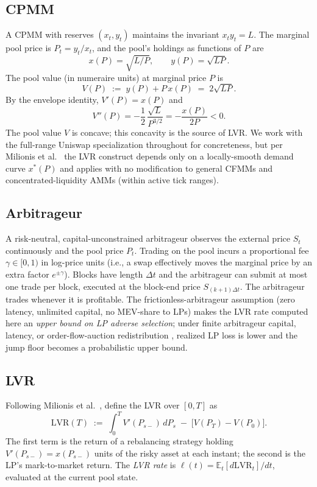 \documentclass[runningheads]{llncs}
\newcommand{\E}{\mathbb{E}}
\newcommand{\dt}{\Delta t}
\newcommand{\1}{\mathbf{1}}
\begin{document}
\subsection{CPMM}
A CPMM with reserves $(x_t, y_t)$ maintains the invariant $x_t y_t = L$. The marginal pool price is $P_t = y_t / x_t$, and the pool's holdings as functions of $P$ are
\[
x(P) = \sqrt{L/P}, \qquad y(P) = \sqrt{L P}.
\]
The pool value (in numeraire units) at marginal price $P$ is
\[
V(P) \;:=\; y(P) + P\,x(P) \;=\; 2\sqrt{LP}.
\]
By the envelope identity, $V'(P) = x(P)$ and
\[
V''(P) = -\frac{1}{2} \, \frac{\sqrt{L}}{P^{3/2}} = -\frac{x(P)}{2P} < 0.
\]
The pool value $V$ is concave; this concavity is the source of LVR. We work with the full-range Uniswap specialization throughout for concreteness, but per Milionis et al.~\cite[Remark~1]{milionis2022automated} the LVR construct depends only on a locally-smooth demand curve $x^*(P)$ and applies with no modification to general CFMMs and concentrated-liquidity AMMs (within active tick ranges).

\subsection{Arbitrageur}
A risk-neutral, capital-unconstrained arbitrageur observes the external price $S_t$ continuously and the pool price $P_t$. Trading on the pool incurs a proportional fee $\gamma \in [0,1)$ in log-price units (i.e., a swap effectively moves the marginal price by an extra factor $e^{\pm\gamma}$). Blocks have length $\dt$ and the arbitrageur can submit at most one trade per block, executed at the block-end price $S_{(k+1)\dt}$. The arbitrageur trades whenever it is profitable. The frictionless-arbitrageur assumption (zero latency, unlimited capital, no MEV-share to LPs) makes the LVR rate computed here an \emph{upper bound on LP adverse selection}; under finite arbitrageur capital, latency, or order-flow-auction redistribution \cite{capponi2024price}, realized LP loss is lower and the jump floor becomes a probabilistic upper bound.

\subsection{LVR}
Following Milionis et al.~\cite{milionis2022automated}, define the LVR over $[0,T]$ as
\begin{equation}\label{eq:lvrdef}
\mathrm{LVR}(T) \;:=\; \int_0^T V'(P_{s-}) \, dP_s \;-\; \big[V(P_T) - V(P_0)\big].
\end{equation}
The first term is the return of a rebalancing strategy holding $V'(P_{s-}) = x(P_{s-})$ units of the risky asset at each instant; the second is the LP's mark-to-market return. The \emph{LVR rate} is $\ell(t) = \E_t[d\mathrm{LVR}_t]/dt$, evaluated at the current pool state.
\end{document}
